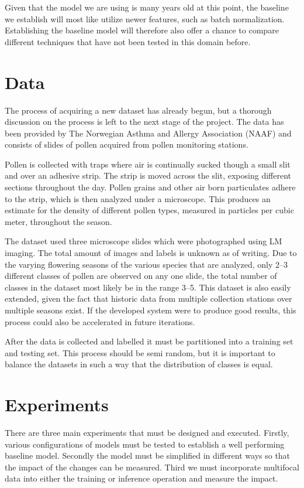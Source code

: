 Given that the model we are using is many years old at this point, the baseline we establish will most like utilize newer features, such as batch normalization.
Establishing the baseline model will therefore also offer a chance to compare different techniques that have not been tested in this domain before.

\section*{Data}
The process of acquiring a new dataset has already begun, but a thorough discussion on the process is left to the next stage of the project.
The data has been provided by The Norwegian Asthma and Allergy Association (NAAF) and consists of slides of pollen acquired from pollen monitoring stations. 

Pollen is collected with traps where air is continually sucked though a small slit and over an adhesive strip.
The strip is moved across the slit, exposing different sections throughout the day.
Pollen grains and other air born particulates adhere to the strip, which is then analyzed under a microscope.
This produces an estimate for the density of different pollen types, measured in particles per cubic meter, throughout the season. 

The dataset used three microscope slides which were photographed using LM imaging.
The total amount of images and labels is unknown as of writing.
Due to the varying flowering seasons of the various species that are analyzed, only 2--3 different classes of pollen are observed on any one slide, the total number of classes in the dataset most likely be in the range 3--5.
This dataset is also easily extended, given the fact that historic data from multiple collection stations over multiple seasons exist.
If the developed system were to produce good results, this process could also be accelerated in future iterations.

After the data is collected and labelled it must be partitioned into a training set and testing set.
This process should be semi random, but it is important to balance the datasets in such a way that the distribution of classes is equal.

\section*{Experiments}
There are three main experiments that must be designed and executed.
Firstly, various configurations of models must be tested to establish a well performing baseline model.
Secondly the model must be simplified in different ways so that the impact of the changes can be measured.
Third we must incorporate multifocal data into either the training or inference operation and measure the impact.

